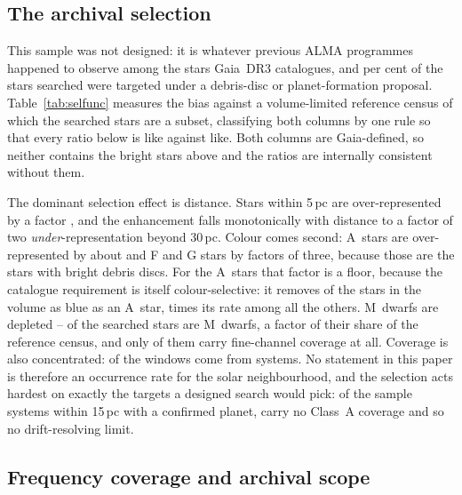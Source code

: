 \subsection{The archival selection}
\label{sec:bias}

This sample was not designed: it is whatever previous ALMA programmes
happened to observe among the stars Gaia~DR3 catalogues, and
\PctDiscProposal{} per cent of the stars searched were targeted under a
debris-disc or planet-formation proposal. Table~\ref{tab:selfunc} measures
the bias against a volume-limited reference census of which the searched
stars are a subset, classifying both columns by one rule so that every ratio
below is like against like. Both columns are Gaia-defined, so neither
contains the bright stars above and the ratios are internally consistent
without them.

The dominant selection effect is distance. Stars within 5\,pc are
over-represented by a factor \SfTopRatio, and the enhancement falls
monotonically with distance to a factor of two \emph{under}-representation
beyond 30\,pc. Colour comes second: A~stars are over-represented by about
\SfARatio{} and F and G stars by factors of three, because those are the
stars with bright debris discs. For the A~stars that factor is a floor,
because the catalogue requirement is itself colour-selective: it removes
\BsNEarly{} of the \BsNEarlyVol{} stars in the volume as blue as an A~star,
\BsEarlyRatio{} times its rate among all the others. M~dwarfs are depleted
--
\SfMSearched{} of the \SfNStar{} searched stars are M~dwarfs, a factor
\SfMRatio{} of their share of the reference census, and only
\SfMClassAStars{} of them carry fine-channel coverage at all. Coverage is also concentrated:
\ConcThreeWin{} of the \NWindows{} windows come from \ConcThreeSys{}
systems. No statement in this paper is therefore an occurrence rate for the
solar neighbourhood, and the selection acts hardest on
exactly the targets a designed search would pick: of the \CsIntNRow{} sample
systems within 15\,pc with a confirmed planet, \CsIntNoClassA{} carry no
Class~A coverage and so no drift-resolving limit.




\subsection{Frequency coverage and archival scope}
\label{sec:coverage}

